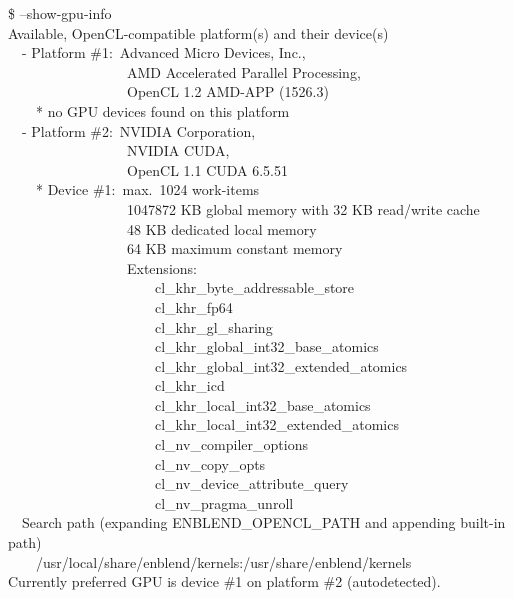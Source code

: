 \begin{codelist}
  \begin{exemplar}[htbp]
    \begin{maxipage}
      \centering
      \begin{terminal}
        \$ \app{} --show-gpu-info \\
        Available, OpenCL-compatible platform(s) and their device(s) \\
        ~~- Platform \#1:~Advanced Micro Devices, Inc., \\
        ~~~~~~~~~~~~~~~~~AMD Accelerated Parallel Processing, \\
        ~~~~~~~~~~~~~~~~~OpenCL 1.2 AMD-APP (1526.3) \\
        ~~~~* no GPU devices found on this platform \\
        ~~- Platform \#2:~NVIDIA Corporation, \\
        ~~~~~~~~~~~~~~~~~NVIDIA CUDA, \\
        ~~~~~~~~~~~~~~~~~OpenCL 1.1 CUDA 6.5.51 \\
        ~~~~* Device \#1:~max.~1024 work-items \\
        ~~~~~~~~~~~~~~~~~1047872 KB global memory with 32 KB read/write cache \\
        ~~~~~~~~~~~~~~~~~48 KB dedicated local memory \\
        ~~~~~~~~~~~~~~~~~64 KB maximum constant memory \\
        ~~~~~~~~~~~~~~~~~Extensions: \\
        ~~~~~~~~~~~~~~~~~~~~~cl\_khr\_byte\_addressable\_store \\
        ~~~~~~~~~~~~~~~~~~~~~cl\_khr\_fp64 \\
        ~~~~~~~~~~~~~~~~~~~~~cl\_khr\_gl\_sharing \\
        ~~~~~~~~~~~~~~~~~~~~~cl\_khr\_global\_int32\_base\_atomics \\
        ~~~~~~~~~~~~~~~~~~~~~cl\_khr\_global\_int32\_extended\_atomics \\
        ~~~~~~~~~~~~~~~~~~~~~cl\_khr\_icd \\
        ~~~~~~~~~~~~~~~~~~~~~cl\_khr\_local\_int32\_base\_atomics \\
        ~~~~~~~~~~~~~~~~~~~~~cl\_khr\_local\_int32\_extended\_atomics \\
        ~~~~~~~~~~~~~~~~~~~~~cl\_nv\_compiler\_options \\
        ~~~~~~~~~~~~~~~~~~~~~cl\_nv\_copy\_opts \\
        ~~~~~~~~~~~~~~~~~~~~~cl\_nv\_device\_attribute\_query \\
        ~~~~~~~~~~~~~~~~~~~~~cl\_nv\_pragma\_unroll \\
        ~~Search path (expanding ENBLEND\_OPENCL\_PATH and appending built-in path) \\
        ~~~~/usr/local/share/enblend/kernels:/usr/share/enblend/kernels \\
        Currently preferred GPU is device \#1 on platform \#2 (autodetected).
      \end{terminal}
    \end{maxipage}


\end{exemplar}
\end{codelist}
